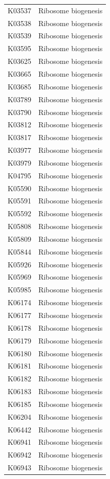 \begin{longtable}{@{}l l@{}}
K03537 & Ribosome biogenesis \\
K03538 & Ribosome biogenesis \\
K03539 & Ribosome biogenesis \\
K03595 & Ribosome biogenesis \\
K03625 & Ribosome biogenesis \\
K03665 & Ribosome biogenesis \\
K03685 & Ribosome biogenesis \\
K03789 & Ribosome biogenesis \\
K03790 & Ribosome biogenesis \\
K03812 & Ribosome biogenesis \\
K03817 & Ribosome biogenesis \\
K03977 & Ribosome biogenesis \\
K03979 & Ribosome biogenesis \\
K04795 & Ribosome biogenesis \\
K05590 & Ribosome biogenesis \\
K05591 & Ribosome biogenesis \\
K05592 & Ribosome biogenesis \\
K05808 & Ribosome biogenesis \\
K05809 & Ribosome biogenesis \\
K05844 & Ribosome biogenesis \\
K05926 & Ribosome biogenesis \\
K05969 & Ribosome biogenesis \\
K05985 & Ribosome biogenesis \\
K06174 & Ribosome biogenesis \\
K06177 & Ribosome biogenesis \\
K06178 & Ribosome biogenesis \\
K06179 & Ribosome biogenesis \\
K06180 & Ribosome biogenesis \\
K06181 & Ribosome biogenesis \\
K06182 & Ribosome biogenesis \\
K06183 & Ribosome biogenesis \\
K06185 & Ribosome biogenesis \\
K06204 & Ribosome biogenesis \\
K06442 & Ribosome biogenesis \\
K06941 & Ribosome biogenesis \\
K06942 & Ribosome biogenesis \\
K06943 & Ribosome biogenesis \\

\end{longtable}
